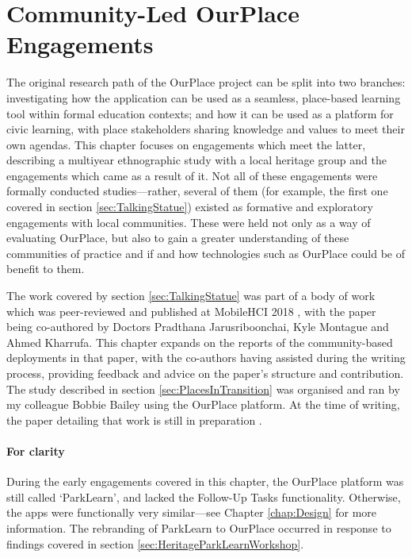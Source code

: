 \chapter{Community-Led OurPlace Engagements}
\label{chap:Community}

The original research path of the OurPlace project can be split into two branches: investigating how the application can be used as a seamless, place-based learning tool within formal education contexts; and how it can be used as a platform for civic learning, with place stakeholders sharing knowledge and values to meet their own agendas. This chapter focuses on engagements which meet the latter, describing a multiyear ethnographic study with a local heritage group and the engagements which came as a result of it. Not all of these engagements were formally conducted studies---rather, several of them (for example, the first one covered in section \ref{sec:TalkingStatue}) existed as formative and exploratory engagements with local communities. These were held not only as a way of evaluating OurPlace, but also to gain a greater understanding of these communities of practice and if and how technologies such as OurPlace could be of benefit to them.

The work covered by section \ref{sec:TalkingStatue} was part of a body of work which was peer-reviewed and published at MobileHCI 2018 \citep{Richardson2018}, with the paper being co-authored by Doctors Pradthana Jarusriboonchai, Kyle Montague and Ahmed Kharrufa. This chapter expands on the reports of the community-based deployments in that paper, with the co-authors having assisted during the writing process, providing feedback and advice on the paper's structure and contribution. The study described in section \ref{sec:PlacesInTransition} was organised and ran by my colleague Bobbie Bailey using the OurPlace platform. At the time of writing, the paper detailing that work is still in preparation \citep{Bailey2020}. 

\subsubsection{For clarity}
During the early engagements covered in this chapter, the OurPlace platform was still called `ParkLearn', and lacked the Follow-Up Tasks functionality. Otherwise, the apps were functionally very similar---see Chapter \ref{chap:Design} for more information. The rebranding of ParkLearn to OurPlace occurred in response to findings covered in section \ref{sec:HeritageParkLearnWorkshop}.

